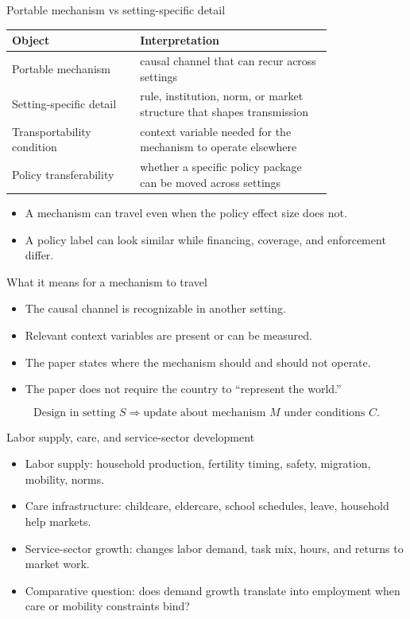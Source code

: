 \documentclass[aspectratio=169,11pt]{beamer}
\begin{document}
\begin{frame}{Portable mechanism vs setting-specific detail}
\begin{tabular}{p{0.32\linewidth} p{0.48\linewidth}}
\toprule
Object & Interpretation \\
\midrule
Portable mechanism & causal channel that can recur across settings \\
Setting-specific detail & rule, institution, norm, or market structure that shapes transmission \\
Transportability condition & context variable needed for the mechanism to operate elsewhere \\
Policy transferability & whether a specific policy package can be moved across settings \\
\bottomrule
\end{tabular}
\vspace{0.4cm}
\begin{itemize}
    \item A mechanism can travel even when the policy effect size does not.
    \item A policy label can look similar while financing, coverage, and enforcement differ.
\end{itemize}
\end{frame}

\begin{frame}{What it means for a mechanism to travel}
\begin{itemize}
    \item The causal channel is recognizable in another setting.
    \item Relevant context variables are present or can be measured.
    \item The paper states where the mechanism should and should not operate.
    \item The paper does not require the country to ``represent the world.''
\end{itemize}
\vspace{0.3cm}
\[
\text{Design in setting } S \Rightarrow \text{update about mechanism } M
\text{ under conditions } C.
\]
\end{frame}

\begin{frame}{Labor supply, care, and service-sector development}
\begin{itemize}
    \item Labor supply: household production, fertility timing, safety, migration, mobility, norms.
    \item Care infrastructure: childcare, eldercare, school schedules, leave, household help markets.
    \item Service-sector growth: changes labor demand, task mix, hours, and returns to market work.
    \item Comparative question: does demand growth translate into employment when care or mobility constraints bind?
\end{itemize}
\end{frame}
\end{document}
